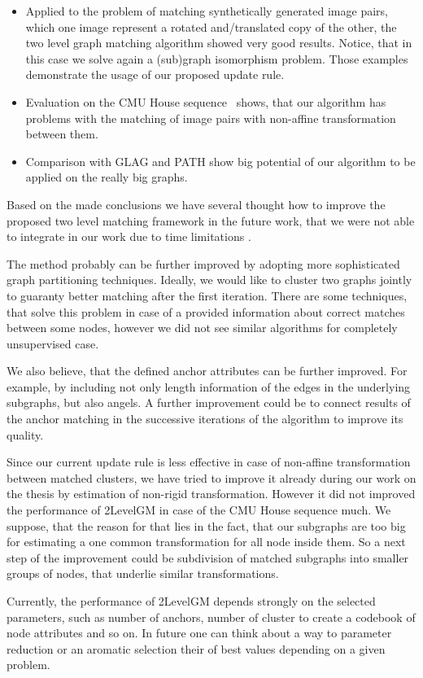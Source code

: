 \begin{itemize}
\item Applied to the problem of matching synthetically generated image pairs, which one image represent a rotated and/translated copy of the other, the two level graph matching algorithm showed very good results. Notice, that in this case we solve again a (sub)graph isomorphism problem. Those examples demonstrate the usage of our proposed update rule.
\item Evaluation on the CMU House sequence~\cite{CMUHouse} shows, that our algorithm has problems with the matching of image pairs with non-affine transformation between them.
\item Comparison with GLAG and PATH show big potential of our algorithm to be applied on the really big graphs.
\end{itemize}

Based on the made conclusions we have several thought how to improve the proposed two level matching framework in the future work, that we were not able to integrate in our work due to time limitations .

The method probably can be further improved by adopting more sophisticated graph partitioning techniques. Ideally, we would like to cluster two graphs jointly to guaranty better matching after the first iteration. There are some techniques, that solve this problem in case of a provided information about correct matches between some nodes, however we did not see similar algorithms for completely unsupervised case.

We also believe, that the defined anchor attributes can be further improved. For example, by including not only length information of the edges in the underlying subgraphs, but also angels. A further improvement could be to connect results of the anchor matching in the successive iterations of the algorithm to improve its quality.

Since our current update rule is less effective in case of non-affine transformation between matched clusters, we have tried to improve it already during our work on the thesis by estimation of non-rigid transformation. However it did not improved the performance of 2LevelGM in case of the CMU House sequence much. We suppose, that the reason for that lies in the fact, that our subgraphs are too big for estimating a one common transformation for all node inside them. So a next step of the improvement could be subdivision of matched subgraphs into smaller groups of nodes, that underlie similar transformations.

Currently, the performance of 2LevelGM depends strongly on the selected parameters, such as number of anchors, number of cluster to create a codebook of node attributes and so on. In future one can think about a way to parameter reduction or an aromatic selection their of best values depending on a given problem. %

